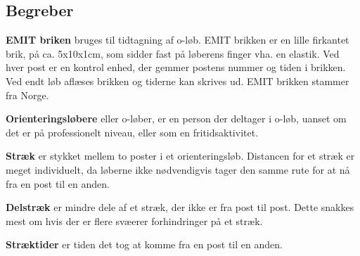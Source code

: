 \subsection{Begreber}
  
\textbf{EMIT briken} bruges til tidtagning af o-løb. EMIT brikken er en lille firkantet brik, på ca. 5x10x1cm, som sidder fast på løberens finger vha. en elastik. Ved hver post er en kontrol enhed, der gemmer postens nummer og tiden i brikken. Ved endt løb aflæses brikken og tiderne kan skrives ud. EMIT brikken stammer fra Norge.

\textbf{Orienteringsløbere} eller o-løber, er en person der deltager i o-løb, uanset om det er på professionelt niveau, eller som en fritidsaktivitet.

\textbf{Stræk} er stykket mellem to poster i et orienteringsløb. Distancen for et stræk er meget individuelt, da løberne ikke nødvendigvis tager den samme rute for at nå fra en post til en anden.

\textbf{Delstræk} er mindre dele af et stræk, der ikke er fra post til post. Dette snakkes mest om hvis der er flere svæerer forhindringer på et stræk.

\textbf{Stræktider} er tiden det tog at komme fra en post til en anden.

